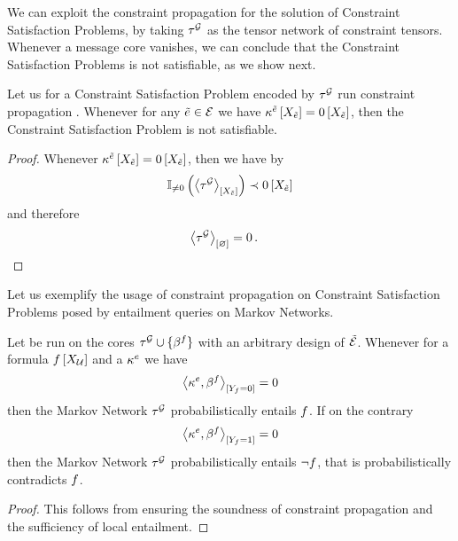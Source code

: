 We can exploit the constraint propagation  for the solution of Constraint Satisfaction Problems, by taking $\tau^{\mathcal{G}}$ as the tensor network of constraint tensors.
Whenever a message core vanishes, we can conclude that the Constraint Satisfaction Problems is not satisfiable, as we show next.

\begin{corollary}
    Let us for a Constraint Satisfaction Problem encoded by $\tau^{\mathcal{G}}$ run constraint propagation .
    Whenever for any $\tilde{e}\in\mathcal{E}$ we have $\kappa^{\tilde{e}}\left[X_{\tilde{e}}\right]=0\left[X_{\tilde{e}}\right]$, then the Constraint Satisfaction Problem is not satisfiable.
\end{corollary}
\begin{proof}
    Whenever $\kappa^{\tilde{e}}\left[X_{\tilde{e}}\right]=0\left[X_{\tilde{e}}\right]$, then we have by 
    \begin{align*}
        \mathbb{I}_{\neq0}\left(\left\langle \tau^{\mathcal{G}}\right\rangle_{\left[ X_{\tilde{e}} \right]}\right) \prec 0\left[X_{\tilde{e}}\right]
    \end{align*}
    and therefore
    \begin{align*}
        \left\langle \tau^{\mathcal{G}}\right\rangle_{\left[ \varnothing \right]} = 0 \, . & \qedhere
    \end{align*}
\end{proof}



Let us exemplify the usage of constraint propagation on Constraint Satisfaction Problems posed by entailment queries on Markov Networks.

\begin{corollary}
    \label{cor:knowledgePropagationMarkovNetworks}
    Let  be run on the cores $\tau^{\mathcal{G}}\cup\{\beta^{f}\}$ with an arbitrary design of $\tilde{\mathcal{E}}$.
    Whenever for a formula $f\left[X_{\mathcal{U}}\right]$ and a $\kappa^{e}$ we have
    \[ \left\langle \kappa^{e},\beta^{f}\right\rangle_{\left[ Y_{f}=0 \right]} =0  \]
    then the Markov Network $\tau^{\mathcal{G}}$ probabilistically entails $f$.
    If on the contrary
    \[ \left\langle \kappa^{e},\beta^{f}\right\rangle_{\left[ Y_{f}=1 \right]} =0  \]
    then the Markov Network $\tau^{\mathcal{G}}$ probabilistically entails $\lnot f$, that is probabilistically contradicts $f$.
\end{corollary}
\begin{proof}
    This follows from  ensuring the soundness of constraint propagation and the sufficiency of local entailment.
\end{proof}


